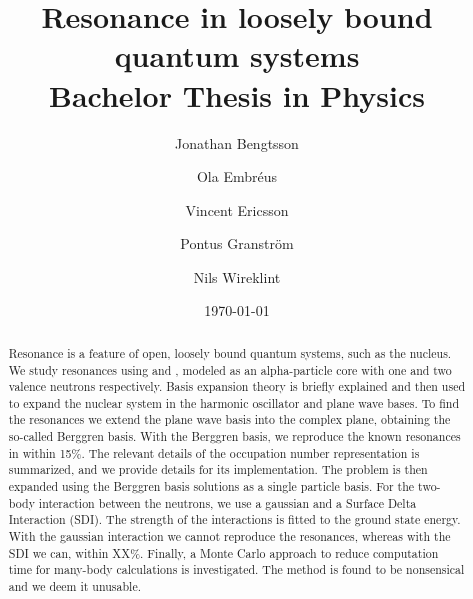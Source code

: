 \documentclass[12pt,a4paper]{report}
\begin{document}
  

\listoftodos

\title{Resonance in loosely bound quantum systems\\ 
\Large Bachelor Thesis in Physics}
\author{Jonathan Bengtsson \and Ola Embréus \and Vincent Ericsson \and Pontus Granström \and Nils Wireklint}
\date{\today}
\maketitle


\begin{abstract}
Resonance is a feature of open, loosely bound quantum systems, such as the nucleus.
We study resonances using  and , modeled as an alpha-particle core with one and two valence neutrons respectively.
Basis expansion theory is briefly explained and then used to expand the nuclear system in the harmonic oscillator and plane wave bases.
To find the resonances we extend the plane wave basis into the complex plane, obtaining the so-called Berggren basis. 
With the Berggren basis, we reproduce the known resonances in  within 15\%.
The relevant details of the occupation number representation is summarized, and we provide details for its implementation.
The  problem is then expanded using the  Berggren basis solutions as a single particle basis. 
For the two-body interaction between the neutrons, we use a gaussian and a Surface Delta Interaction (SDI).
The strength of the interactions is fitted to the  ground state energy.
With the gaussian interaction we cannot reproduce the  resonances, whereas with the SDI we can, within XX\%.
Finally, a Monte Carlo approach to reduce computation time for many-body calculations is investigated.
The method is found to be nonsensical and we deem it unusable.

\end{abstract}

\tableofcontents











\end{document}
